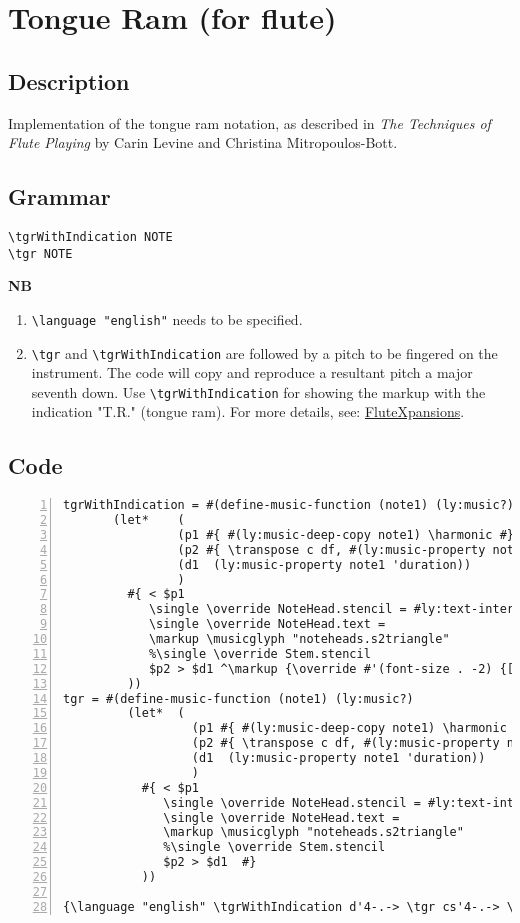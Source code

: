 

\section {Tongue Ram (for flute)}
\hfill
\subsection{Description}
Implementation of the tongue ram notation, as described in \textit{The Techniques of Flute Playing} by Carin Levine and Christina Mitropoulos-Bott.\autocite[28]{RN1695} 
\subsection{Grammar}
\begin{verbatim}
\tgrWithIndication NOTE
\tgr NOTE
\end{verbatim}
\textbf{NB} \begin{enumerate}
\item \verb|\language "english"| needs to be specified. 
\item \verb|\tgr| and \verb|\tgrWithIndication| are followed by a pitch to be fingered on the instrument. The code will copy and reproduce a resultant pitch a major seventh down. Use \verb|\tgrWithIndication| for showing the markup with the indication "T.R." (tongue ram). For more details, see: \href{https://www.flutexpansions.com/tongue-ram}{FluteXpansions}.
\end{enumerate}
\subsection{Code}
\begin{Verbatim}[numbers=left,xleftmargin=5mm]
tgrWithIndication = #(define-music-function (note1) (ly:music?)
       (let* 	(
                (p1 #{ #(ly:music-deep-copy note1) \harmonic #})
                (p2 #{ \transpose c df, #(ly:music-property note1 'pitch)#})
                (d1  (ly:music-property note1 'duration))
                )
         #{ < $p1
            \single \override NoteHead.stencil = #ly:text-interface::print
            \single \override NoteHead.text =
            \markup \musicglyph "noteheads.s2triangle"
            %\single \override Stem.stencil
            $p2 > $d1 ^\markup {\override #'(font-size . -2) {[T.R.]} }  #}
         ))
tgr = #(define-music-function (note1) (ly:music?)
         (let* 	(
                  (p1 #{ #(ly:music-deep-copy note1) \harmonic #})
                  (p2 #{ \transpose c df, #(ly:music-property note1 'pitch)#})
                  (d1  (ly:music-property note1 'duration))
                  )
           #{ < $p1
              \single \override NoteHead.stencil = #ly:text-interface::print
              \single \override NoteHead.text =
              \markup \musicglyph "noteheads.s2triangle"
              %\single \override Stem.stencil
              $p2 > $d1  #}
           ))

{\language "english" \tgrWithIndication d'4-.-> \tgr cs'4-.-> \tgr ef'4-.->}
\end{Verbatim}

